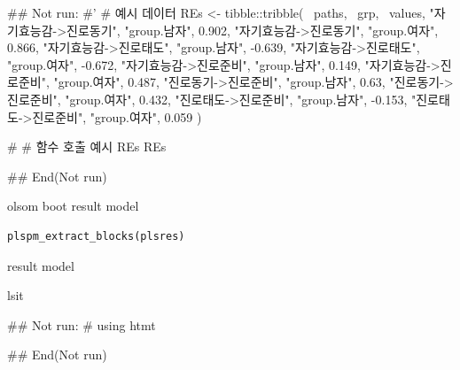 \documentclass[a4paper]{book}
\begin{document}
%
\begin{Examples}
\begin{ExampleCode}

\#\# Not run: 
#'
# 예시 데이터
REs <- tibble::tribble(
  ~paths, ~grp, ~values,
  "자기효능감->진로동기", "group.남자", 0.902,
  "자기효능감->진로동기", "group.여자", 0.866,
  "자기효능감->진로태도", "group.남자", -0.639,
  "자기효능감->진로태도", "group.여자", -0.672,
  "자기효능감->진로준비", "group.남자", 0.149,
  "자기효능감->진로준비", "group.여자", 0.487,
  "진로동기->진로준비", "group.남자", 0.63,
  "진로동기->진로준비", "group.여자", 0.432,
  "진로태도->진로준비", "group.남자", -0.153,
  "진로태도->진로준비", "group.여자", 0.059
)

# # 함수 호출 예시
REs %
REs %

## End(Not run)

\end{ExampleCode}
\end{Examples}

%
\begin{Description}
olsom boot result model
\end{Description}
%
\begin{Usage}
\begin{verbatim}
plspm_extract_blocks(plsres)
\end{verbatim}
\end{Usage}
%
\begin{Arguments}
\begin{ldescription}
\item[\code{plsres}] result model
\end{ldescription}
\end{Arguments}
%
\begin{Value}
lsit
\end{Value}
%
\begin{Examples}
\begin{ExampleCode}

\#\# Not run: 
# using htmt

## End(Not run)


\end{ExampleCode}
\end{Examples}
\end{document}
